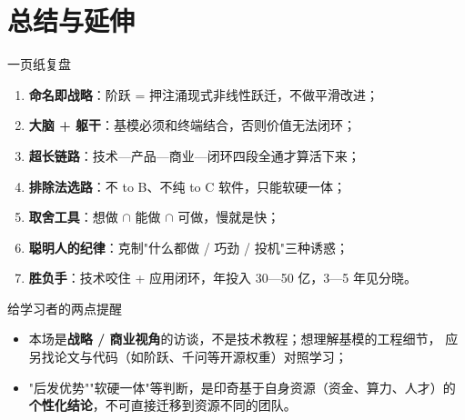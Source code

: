 \documentclass[a4paper]{article}
\begin{document}
\section{总结与延伸}

\begin{knowledgebox}{一页纸复盘}
\begin{enumerate}
    \item \textbf{命名即战略}：阶跃 = 押注涌现式非线性跃迁，不做平滑改进；
    \item \textbf{大脑 + 躯干}：基模必须和终端结合，否则价值无法闭环；
    \item \textbf{超长链路}：技术—产品—商业—闭环四段全通才算活下来；
    \item \textbf{排除法选路}：不 to B、不纯 to C 软件，只能软硬一体；
    \item \textbf{取舍工具}：想做 $\cap$ 能做 $\cap$ 可做，慢就是快；
    \item \textbf{聪明人的纪律}：克制"什么都做 / 巧劲 / 投机"三种诱惑；
    \item \textbf{胜负手}：技术咬住 + 应用闭环，年投入 30—50 亿，3—5 年见分晓。
\end{enumerate}
\end{knowledgebox}

\begin{warningbox}{给学习者的两点提醒}
\begin{itemize}
    \item 本场是\textbf{战略 / 商业视角}的访谈，不是技术教程；想理解基模的工程细节，
        应另找论文与代码（如阶跃、千问等开源权重）对照学习；
    \item "后发优势""软硬一体"等判断，是印奇基于自身资源（资金、算力、人才）的
        \textbf{个性化结论}，不可直接迁移到资源不同的团队。
\end{itemize}
\end{warningbox}

\end{document}
